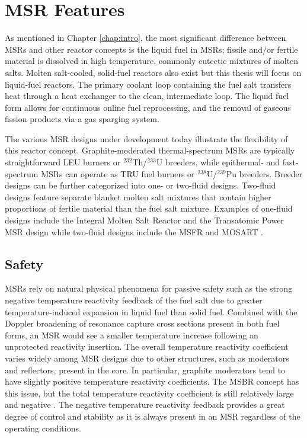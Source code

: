 \section{\gls{MSR} Features}

As mentioned in Chapter \ref{chap:intro}, the most significant difference
between \glspl{MSR} and other reactor concepts is the liquid fuel in
\glspl{MSR}; fissile and/or fertile material is dissolved in high temperature,
commonly eutectic mixtures of molten salts. Molten salt-cooled, solid-fuel
reactors also exist but this thesis will focus on liquid-fuel reactors.
The primary coolant loop containing the fuel salt
transfers heat through a heat exchanger to the clean, intermediate
loop. The liquid fuel form allows for continuous online fuel reprocessing,
and the removal of gaseous fission products via a gas sparging system.

The various \gls{MSR} designs under development today illustrate the
flexibility of this reactor concept. Graphite-moderated thermal-spectrum
\glspl{MSR} are typically straightforward \gls{LEU} burners or
$^{232}$Th/$^{233}$U breeders, while epithermal- and
fast-spectrum \glspl{MSR} can operate as \gls{TRU} fuel burners or
$^{238}$U/$^{239}$Pu breeders. Breeder designs can be further categorized into
one- or two-fluid designs. Two-fluid designs feature separate blanket molten
salt mixtures that contain higher proportions of fertile material than the
fuel salt mixture. Examples of one-fluid designs include the Integral Molten
Salt Reactor \cite{leblanc_integral_2015} and the Transatomic Power
\gls{MSR} design \cite{transatomic_power_corporation_technical_2016} while
two-fluid designs include the \gls{MSFR} \cite{merle_optimized_2007} and
\gls{MOSART} \cite{ignatiev_molten_2014}.

\subsection{Safety}

\glspl{MSR} rely on natural physical phenomena for passive safety such as the
strong negative temperature reactivity feedback of the fuel salt due to
greater temperature-induced expansion in liquid fuel than solid
fuel. Combined with the Doppler broadening of resonance capture cross sections
present in both fuel forms, an \gls{MSR} would see a smaller temperature
increase following an unprotected reactivity insertion. The overall
temperature reactivity coefficient varies widely among \gls{MSR}
designs due to other structures, such as moderators and reflectors, present in
the core. In particular, graphite moderators tend to have slightly positive
temperature reactivity coefficients. The \gls{MSBR} concept has this issue,
but the total temperature reactivity coefficient is still relatively large and
negative \cite{rykhlevskii_modeling_2019}. The negative temperature reactivity
feedback provides a great degree of control and stability as it is always
present in an \gls{MSR} regardless of the operating conditions.

